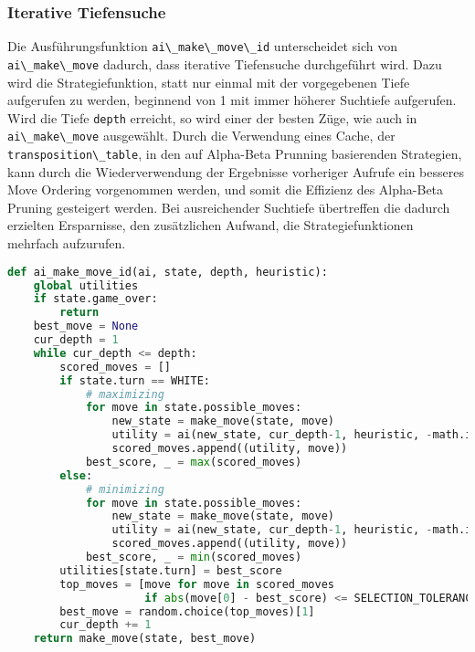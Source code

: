 \hypertarget{iterative-tiefensuche}{%
\subsubsection{Iterative Tiefensuche}\label{iterative-tiefensuche}}

Die Ausführungsfunktion \passthrough{\lstinline!ai\_make\_move\_id!}
unterscheidet sich von \passthrough{\lstinline!ai\_make\_move!} dadurch,
dass iterative Tiefensuche durchgeführt wird. Dazu wird die
Strategiefunktion, statt nur einmal mit der vorgegebenen Tiefe
aufgerufen zu werden, beginnend von 1 mit immer höherer Suchtiefe
aufgerufen. Wird die Tiefe \passthrough{\lstinline!depth!} erreicht, so
wird einer der besten Züge, wie auch in
\passthrough{\lstinline!ai\_make\_move!} ausgewählt. Durch die
Verwendung eines Cache, der
\passthrough{\lstinline!transposition\_table!}, in den auf Alpha-Beta
Prunning basierenden Strategien, kann durch die Wiederverwendung der
Ergebnisse vorheriger Aufrufe ein besseres Move Ordering vorgenommen
werden, und somit die Effizienz des Alpha-Beta Pruning gesteigert
werden. Bei ausreichender Suchtiefe übertreffen die dadurch erzielten
Ersparnisse, den zusätzlichen Aufwand, die Strategiefunktionen mehrfach
aufzurufen.

\begin{lstlisting}[language=Python]
def ai_make_move_id(ai, state, depth, heuristic):
    global utilities
    if state.game_over:
        return
    best_move = None
    cur_depth = 1
    while cur_depth <= depth:
        scored_moves = []
        if state.turn == WHITE:
            # maximizing
            for move in state.possible_moves:
                new_state = make_move(state, move)
                utility = ai(new_state, cur_depth-1, heuristic, -math.inf, math.inf)
                scored_moves.append((utility, move))
            best_score, _ = max(scored_moves)
        else:
            # minimizing
            for move in state.possible_moves:
                new_state = make_move(state, move)
                utility = ai(new_state, cur_depth-1, heuristic, -math.inf, math.inf)
                scored_moves.append((utility, move))
            best_score, _ = min(scored_moves)
        utilities[state.turn] = best_score
        top_moves = [move for move in scored_moves
                     if abs(move[0] - best_score) <= SELECTION_TOLERANCE]
        best_move = random.choice(top_moves)[1]
        cur_depth += 1
    return make_move(state, best_move)
\end{lstlisting}

